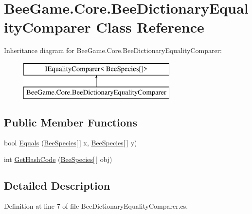\hypertarget{class_bee_game_1_1_core_1_1_bee_dictionary_equality_comparer}{}\section{Bee\+Game.\+Core.\+Bee\+Dictionary\+Equality\+Comparer Class Reference}
\label{class_bee_game_1_1_core_1_1_bee_dictionary_equality_comparer}
Inheritance diagram for Bee\+Game.\+Core.\+Bee\+Dictionary\+Equality\+Comparer\+:\begin{figure}[H]
\begin{center}
\leavevmode
\includegraphics[height=2.000000cm]{class_bee_game_1_1_core_1_1_bee_dictionary_equality_comparer}
\end{center}
\end{figure}
\subsection*{Public Member Functions}
\begin{DoxyCompactItemize}
\item 
bool \hyperlink{class_bee_game_1_1_core_1_1_bee_dictionary_equality_comparer_a04027b45a04e74e25840b185a17c8cba}{Equals} (\hyperlink{namespace_bee_game_1_1_enums_aa2ead984825678d83c42d48f6382619c}{Bee\+Species}\mbox{[}$\,$\mbox{]} x, \hyperlink{namespace_bee_game_1_1_enums_aa2ead984825678d83c42d48f6382619c}{Bee\+Species}\mbox{[}$\,$\mbox{]} y)
\item 
int \hyperlink{class_bee_game_1_1_core_1_1_bee_dictionary_equality_comparer_acf4f3631aea262ea22aee9eaaffba8f4}{Get\+Hash\+Code} (\hyperlink{namespace_bee_game_1_1_enums_aa2ead984825678d83c42d48f6382619c}{Bee\+Species}\mbox{[}$\,$\mbox{]} obj)
\end{DoxyCompactItemize}


\subsection{Detailed Description}


Definition at line 7 of file Bee\+Dictionary\+Equality\+Comparer.\+cs.



